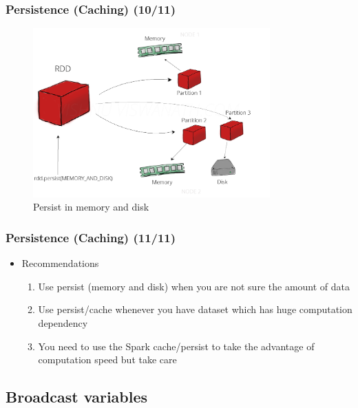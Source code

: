 \begin{frame}
	\frametitle{Persistence (Caching) (10/11)}
		\begin{figure}
			\caption{Persist in memory and disk}  		  	
			\includegraphics[width=\textwidth,height=6.5cm]{Graphics/persist.PNG}
		\end{figure}
		
\end{frame}



\begin{frame}
	\frametitle{Persistence (Caching) (11/11)}
	\begin{itemize}[<+->]
		\item Recommendations
		\begin{enumerate}
			\item Use persist (memory and disk) when you are not sure the amount of data
			\item Use persist/cache whenever you have dataset which has huge computation dependency
			\item You need to use the Spark cache/persist to take the advantage of computation speed but take care
		\end{enumerate}
	\end{itemize}
\end{frame}

\subsection{Broadcast variables}

